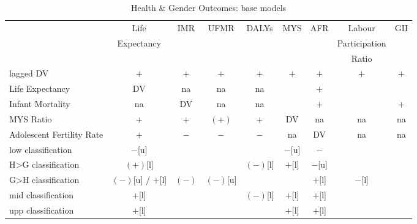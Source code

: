 \begin{table}[!htbp]
\small
\centering
\caption{Health \& Gender Outcomes: base models}
\label{table_hg_base}
\begin{tabular}{lcccccccc}
\toprule
                          & Life              & IMR   & UFMR     & DALYs    & MYS    & AFR    & Labour        & GII \\
                          & Expectancy        &       &          &          &        &        & Participation & \\
                          &                   &       &          &          &        &        & Ratio         & \\
\midrule
lagged DV                 & $+$               & $+$   & $+$      & $+$      & $+$    & $+$    & $+$           & $+$ \\
Life Expectancy           & DV                & na    & na       & na       &        & $+$    &               & \\
Infant Mortality          & na                & DV    & na       & na       &        & $+$    &               & $+$ \\
MYS Ratio                 & $+$               & $+$   & $(+)$    & $+$      & DV     & na     & na            & na \\
Adolescent Fertility Rate & $+$               & $-$   & $-$      & $-$      & na     & DV     & na            & na \\
low classification        & $-$[u]            &       &          &          & $-$[u] & $-$    &               & \\
H>G classification        & $(+)$[l]          &       &          & $(-)$[l] & $+$[l] & $-$[u] &               & \\
G>H classification        & $(-)$[u] / $+$[l] & $(-)$ & $(-)$[u] &          &        & $+$[l] & $-$[l]        & \\
mid classification        & $+$[l]            &       &          & $(-)$[l] & $+$[l] & $+$[l] &               & \\
upp classification        & $+$[l]            &       &          &          & $+$[l] & $+$[l] &               & \\
\bottomrule
\end{tabular}
\end{table}
